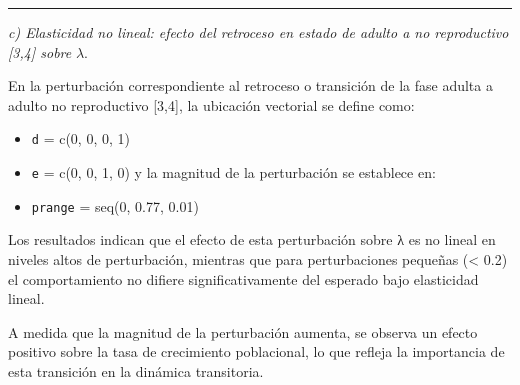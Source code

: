 \documentclass[
  12pt,
  letterpaper,
]{book}
\providecommand{\tightlist}{%
  \setlength{\itemsep}{0pt}\setlength{\parskip}{0pt}}\usepackage{longtable,booktabs,array}
\begin{document}
\begin{center}\rule{0.5\linewidth}{0.5pt}\end{center}

\emph{c) Elasticidad no lineal: efecto del retroceso en estado de adulto
a no reproductivo {[}3,4{]} sobre} \(\lambda\).

En la perturbación correspondiente al retroceso o transición de la fase
adulta a adulto no reproductivo {[}3,4{]}, la ubicación vectorial se
define como:

\begin{itemize}
\tightlist
\item
  \texttt{d} = c(0, 0, 0, 1)
\item
  \texttt{e} = c(0, 0, 1, 0) y la magnitud de la perturbación se
  establece en:
\item
  \texttt{prange} = seq(0, 0.77, 0.01)
\end{itemize}

Los resultados indican que el efecto de esta perturbación sobre λ es no
lineal en niveles altos de perturbación, mientras que para
perturbaciones pequeñas (\textless{} 0.2) el comportamiento no difiere
significativamente del esperado bajo elasticidad lineal.

A medida que la magnitud de la perturbación aumenta, se observa un
efecto positivo sobre la tasa de crecimiento poblacional, lo que refleja
la importancia de esta transición en la dinámica transitoria.
\end{document}
